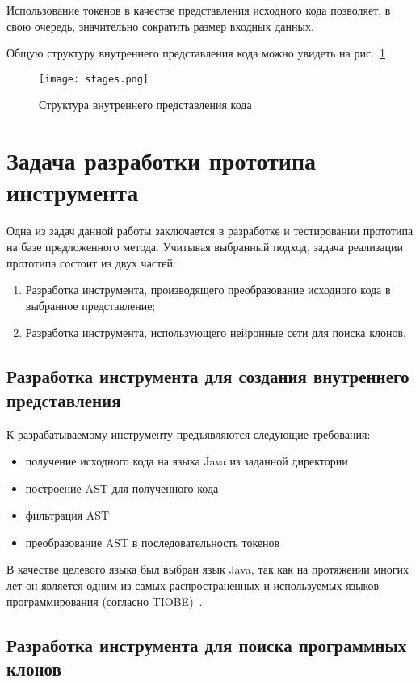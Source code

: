 Использование токенов в качестве представления исходного кода позволяет, в свою очередь, значительно сократить размер входных данных.

Общую структуру внутреннего представления кода можно увидеть на рис.~\ref{fig:stages}

\begin{figure}[htbp]
\centering
\texttt{[image: stages.png]}
\caption{Структура внутреннего представления кода}
\label{fig:stages}
\end{figure}

\section{Задача разработки прототипа инструмента}

Одна из задач данной работы заключается в разработке и тестировании прототипа на базе предложенного метода. Учитывая выбранный подход, задача реализации прототипа состоит из двух частей:
\begin{enumerate}
\item Разработка инструмента, производящего преобразование исходного кода в выбранное представление;
\item Разработка инструмента, использующего нейронные сети для поиска клонов.
\end{enumerate}

\subsection{Разработка инструмента для создания внутреннего представления}

К разрабатываемому инструменту предъявляются следующие требования:
\begin{itemize}
\setlength\itemsep{0mm}
\item получение исходного кода на языка Java из заданной директории
\item построение AST для полученного кода
\item фильтрация AST
\item преобразование AST в последовательность токенов
\end{itemize}

В качестве целевого языка был выбран язык Java, так как на протяжении многих лет он является одним из самых распространенных и используемых языков программирования (согласно TIOBE)~\cite{TIOBE}. 

\subsection{Разработка инструмента для поиска программных клонов}

